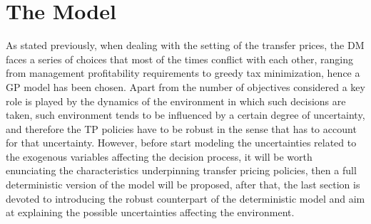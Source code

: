 \documentclass[conference,final,]{IEEEtran}
\begin{document}
\hypertarget{the-model}{%
\section{The Model}\label{the-model}}
As stated previously, when dealing with the setting of the transfer prices, the DM faces a series of choices that most of the times conflict with each other, ranging from management profitability requirements to greedy tax minimization, hence a GP model has been chosen. Apart from the number of objectives considered a key role is played by the dynamics of the environment in which such decisions are taken, such environment tends to be influenced by a certain degree of uncertainty, and therefore the TP policies have to be robust in the sense that has to account for that uncertainty. However, before start modeling the uncertainties related to the exogenous variables affecting the decision process, it will be worth enunciating the characteristics underpinning transfer pricing policies, then a full deterministic version of the model will be proposed, after that, the last section is devoted to introducing the robust counterpart of the deterministic model and aim at explaining the possible uncertainties affecting the environment.
\end{document}
